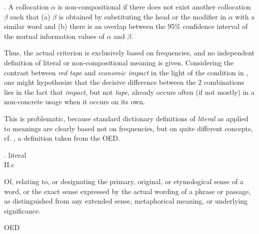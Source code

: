 \ex. A collocation $\alpha$ is non-compositional if there does not exist another
collocation $\beta$ such that (a) $\beta$ is obtained by substituting the head or the
modifier in $\alpha$ with a similar word and (b) there is an overlap between the 95\%
confidence interval of the mutual information values of $\alpha$ and $\beta$.

Thus, the actual criterion is exclusively based on frequencies, and no
independent definition of literal or non-compositional meaning is
given. Considering the contrast between \emph{red tape} and
\emph{economic impact} in the light of the condition in \Last,
one might hypothesize that the decisive difference between the 2
combinations lies in the fact that \emph{impact}, but not \emph{tape},
already occurs often (if not mostly) in a non-concrete usage when
it occurs on its own.

This is problematic, because standard dictionary definitions of
\emph{literal} as applied to meanings are clearly based not on frequencies,
but on quite different concepts, cf. \Next, a definition taken from the OED.



\ex. literal\\
II.c
\begin{sloppypar}
Of, relating to, or designating the primary, original, or etymological sense
of a word, or the exact sense expressed by the actual wording of a phrase or
passage, as distinguished from any extended sense, metaphorical meaning, or
underlying significance. 
\end{sloppypar}
OED

